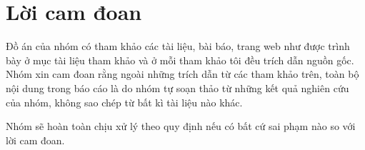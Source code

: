 \section*{Lời cam đoan}
\thispagestyle{empty}

Đồ án của nhóm có tham khảo các tài liệu, bài báo, trang web như được trình bày ở mục tài liệu tham khảo và ở mỗi tham khảo tôi đều trích dẫn nguồn gốc. Nhóm xin cam đoan rằng ngoài những trích dẫn từ các tham khảo trên, toàn bộ nội dung trong báo cáo là do nhóm tự soạn thảo từ những kết quả nghiên cứu của nhóm, không sao chép từ bất kì tài liệu nào khác.

Nhóm sẽ hoàn toàn chịu xử lý theo quy định nếu có bất cứ sai phạm nào so với lời cam đoan.

\clearpage
{}
